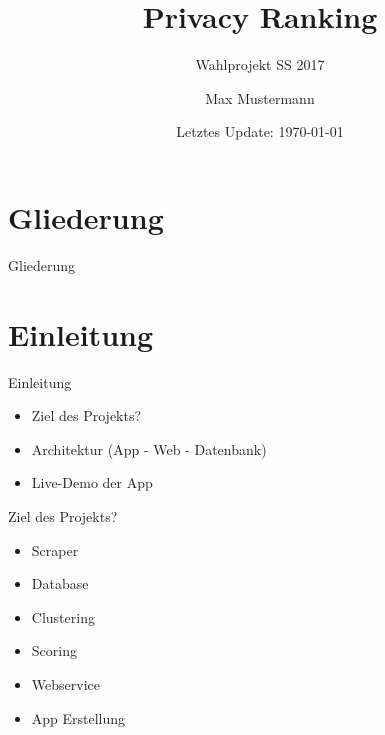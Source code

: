 \documentclass[compress,t]{beamer}
\title{Privacy Ranking}
\subtitle{Wahlprojekt SS 2017}
\date{Letztes Update: \today}
\author{Max Mustermann}
\institute{Studienbereich Informatik\\Hochschule {RheinMain}}
\begin{document}
\maketitle


\section*{Gliederung}
\begin{frame}{Gliederung}
    \tableofcontents[hideallsubsections]
\end{frame}



\section{Einleitung}

\begin{frame}{Einleitung}

    \begin{itemize}
        \item Ziel des Projekts?
        \item Architektur (App - Web - Datenbank)
        \item Live-Demo der App
    \end{itemize}

\end{frame}

\begin{frame}{Ziel des Projekts?}

    \begin{itemize}
        \item Scraper
        \item Database
        \item Clustering
        \item Scoring
        \item Webservice
        \item App Erstellung
    \end{itemize}

\end{frame}
\end{document}
